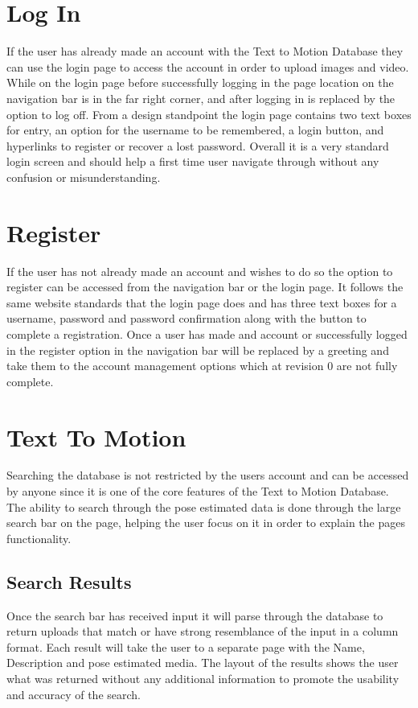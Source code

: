 \documentclass{scrreprt}
\begin{document}
\section{Log In}
If the user has already made an account with the Text to Motion Database they can use the login page to access the account in order to upload images and video. While on the login page before successfully logging in the page location on the navigation bar is in the far right corner, and after logging in is replaced by the option to log off.
From a design standpoint the login page contains two text boxes for entry, an option for the username to be remembered, a login button, and hyperlinks to register or recover a lost password. Overall it is a very standard login screen and should help a first time user navigate through without any confusion or misunderstanding. 

\section{Register}
If the user has not already made an account and wishes to do so the option to register can be accessed from the navigation bar or the login page. It follows the same website standards that the login page does and has three text boxes for a username, password and password confirmation along with the button to complete a registration. Once a user has made and account or successfully logged in the register option in the navigation bar will be replaced by a greeting and take them to the account management options which at revision 0 are not fully complete.

\section{Text To Motion}
Searching the database is not restricted by the users account and can be accessed by anyone since it is one of the core features of the Text to Motion Database. The ability to search through the pose estimated data is done through the large search bar on the page, helping the user focus on it in order to explain the pages functionality. 

\subsection{Search Results}
Once the search bar has received input it will parse through the database to return uploads that match or have strong resemblance of the input in a column format. Each result will take the user to a separate page with the Name, Description and pose estimated media. The layout of the results shows the user what was returned without any additional information to promote the usability and accuracy of the search.
\end{document}
